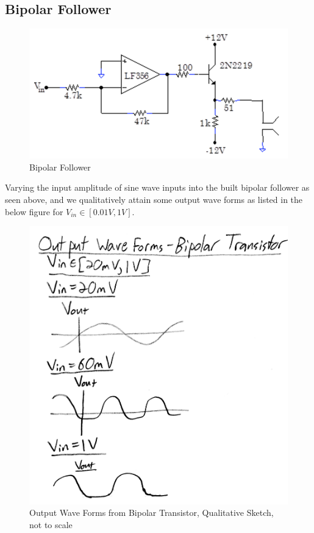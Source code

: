 \documentclass{article}
\begin{document}
\subsection{Bipolar Follower}
    \begin{figure}[H]
        \centering
        \includegraphics[scale = 0.5]{8.png}
        \caption{Bipolar Follower \cite{lab8}}
        \label{fig:my_label}
    \end{figure}
    Varying the input amplitude of sine wave inputs into the built bipolar follower as seen above, and we qualitatively attain some output wave forms as listed in the below figure for $V_{in} \in [0.01V, 1V]$.
    \begin{figure}[H]
        \centering
        \includegraphics[scale = 0.12]{8a.jpg}
        \caption{Output Wave Forms from Bipolar Transistor, Qualitative Sketch, not to scale}
        \label{fig:my_label}
    \end{figure}
\end{document}
